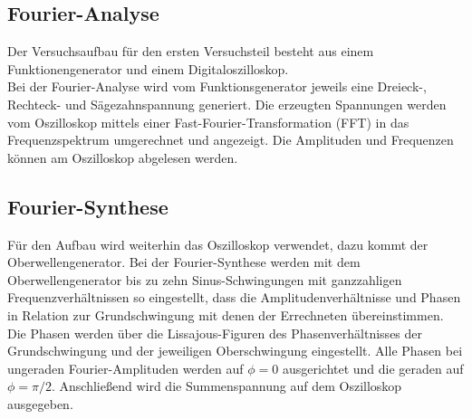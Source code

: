 \subsection{Fourier-Analyse}
Der Versuchsaufbau für den ersten Versuchsteil besteht aus einem Funktionengenerator und einem Digitaloszilloskop. \\
Bei der Fourier-Analyse wird vom Funktionsgenerator jeweils eine Dreieck-, Rechteck- und Sägezahnspannung generiert. Die erzeugten Spannungen werden vom Oszilloskop mittels einer Fast-Fourier-Transformation (FFT) in das Frequenzspektrum umgerechnet und angezeigt. Die Amplituden und Frequenzen können am Oszilloskop abgelesen werden.
\subsection{Fourier-Synthese}
Für den Aufbau wird weiterhin das Oszilloskop verwendet, dazu kommt der Oberwellengenerator.
Bei der Fourier-Synthese werden mit dem Oberwellengenerator bis zu zehn Sinus-Schwingungen mit ganzzahligen Frequenzverhältnissen so eingestellt, dass die Amplitudenverhältnisse und Phasen in Relation zur Grundschwingung mit denen der Errechneten übereinstimmen. \\
Die Phasen werden über die Lissajous-Figuren des Phasenverhältnisses der Grundschwingung und der jeweiligen Oberschwingung eingestellt. Alle Phasen bei ungeraden Fourier-Amplituden werden auf $\phi = 0$ ausgerichtet und die geraden auf $\phi = \pi/2$.
Anschließend wird die Summenspannung auf dem Oszilloskop ausgegeben.

